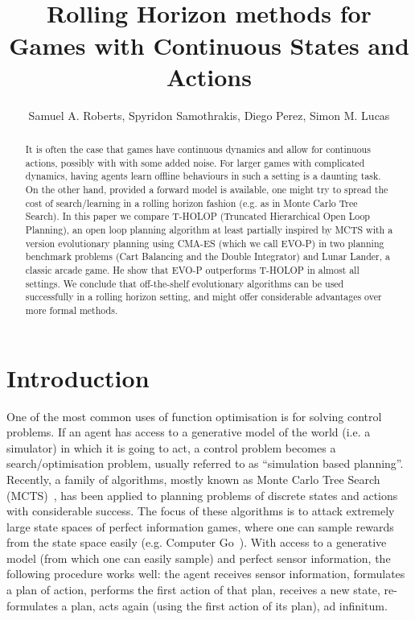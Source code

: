 \documentclass[conference]{IEEEtran}
\begin{document}
\title{\ \\ \LARGE\bf Rolling Horizon methods for Games with Continuous States and Actions } 

\author{Samuel A. Roberts, Spyridon Samothrakis, Diego Perez, Simon M. Lucas}


\maketitle


\begin{abstract}
It is often the case that games have continuous dynamics and allow for continuous actions, possibly with with some added noise. For larger games with complicated dynamics, having agents learn offline behaviours in such a setting is a daunting task. On the other hand, provided a forward model is available, one might try to spread the cost of search/learning in a rolling horizon fashion (e.g. as in Monte Carlo Tree Search). In this paper we compare T-HOLOP (Truncated Hierarchical Open Loop Planning), an open loop planning algorithm at least partially inspired by MCTS with a version evolutionary planning using CMA-ES (which we call EVO-P) in two planning benchmark problems (Cart Balancing and the Double Integrator) and Lunar Lander, a classic arcade game. He show that EVO-P outperforms T-HOLOP in almost all settings. We conclude that off-the-shelf evolutionary algorithms can be used successfully in a rolling horizon setting, and might offer considerable advantages over more formal methods. 

\end{abstract}




\section{Introduction} \label{Introduction}
One of the most common uses of function optimisation is for solving control problems. If an agent has access to a generative model of the world (i.e. a simulator) in which it is going to act, a control problem becomes a search/optimisation problem, usually referred to as ``simulation based planning''. Recently, a family of algorithms, mostly known as Monte Carlo Tree Search (MCTS)~\cite{browne2012survey}, has been applied to planning problems of discrete states and actions with considerable success. The focus of these algorithms is to attack extremely large state spaces of perfect information games, where one can sample rewards from the state space easily (e.g. Computer Go~\cite{gelly2006modification}). With access to a generative model (from which one can easily sample) and perfect sensor information, the following procedure works well: the agent receives sensor information, formulates a plan of action, performs the first action of that plan, receives a new state, re-formulates a plan, acts again (using the first action of its plan),  ad infinitum.
\end{document}
